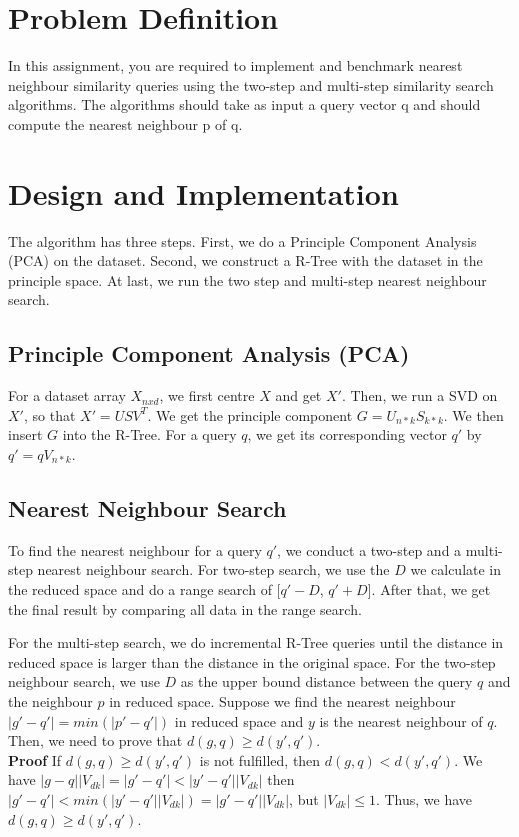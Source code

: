\documentclass{article}
\begin{document}
\section{Problem Definition}
In this assignment, you are required to implement and benchmark nearest
neighbour similarity queries using
the two-step and multi-step similarity search
algorithms. The algorithms should take as input a query
vector q and should compute the nearest neighbour p of q.

\section{Design and Implementation}
The algorithm has three steps. First, we do a Principle Component Analysis (PCA)
on the dataset. Second, we construct a R-Tree with the dataset in the principle
space. At last, we run the two step and multi-step nearest neighbour search.

\subsection{Principle Component Analysis (PCA)}
For a dataset array $X_{nxd}$, we first centre $X$ and get $X'$. Then,
we run a SVD on $X'$, so that $X' = USV^T$. We get the principle component
$G = U_{n*k}S_{k*k}$. We then insert $G$ into the R-Tree. For a query $q$,
we get its corresponding vector $q'$ by $q' = qV_{n*k}$.


\subsection{Nearest Neighbour Search}
To find the nearest neighbour for a query $q'$, we conduct a two-step and a multi-step
nearest neighbour search. For two-step search, we use the $D$ we calculate in
the reduced space and do a range search of [$q' - D$, $q' + D$]. After that, we
get the final result by comparing all data in the range search.

For the multi-step search, we do incremental R-Tree queries until the distance
in reduced space
is larger than the distance in the original space.
For the two-step neighbour search, we use $D$ as the upper bound distance between
the query $q$ and the neighbour $p$ in reduced space. Suppose we find the nearest
neighbour $ |g' - q'| = min(|p' - q'|)$ in reduced space and $y$ is the nearest neighbour
of $q$. Then, we need to prove that $d(g, q) \geq d(y', q')$. \\
\textbf{Proof} If $d(g, q) \geq d(y', q')$ is not fulfilled, then $d(g, q) < d(y', q')$.
We have
$|g - q||V_{dk}| = |g' - q'| < |y' - q'||V_{dk}|$
then $|g' - q'| < min(|y' - q'||V_{dk}|) = |g' - q'||V_{dk}|$, but
$|V_{dk}| \leq 1$. Thus, we have $d(g, q) \geq d(y', q')$.
\end{document}
